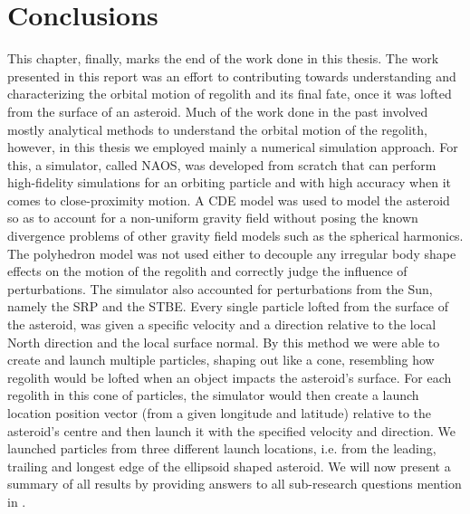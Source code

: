 \chapter{Conclusions}
\label{chap:conclusions}
\graphicspath{{Conclusions/}}

This chapter, finally, marks the end of the work done in this thesis. The work presented in this report was an effort to contributing towards understanding and characterizing the orbital motion of regolith and its final fate, once it was lofted from the surface of an asteroid. Much of the work done in the past involved mostly analytical methods to understand the orbital motion of the regolith, however, in this thesis we employed mainly a numerical simulation approach. For this, a simulator, called \gls{NAOS}, was developed from scratch that can perform high-fidelity simulations for an orbiting particle and with high accuracy when it comes to close-proximity motion.
%
\newline\newline
%
A \gls{CDE} model was used to model the asteroid so as to account for a non-uniform gravity field without posing the known divergence problems of other gravity field models such as the spherical harmonics. The polyhedron model was not used either to decouple any irregular body shape effects on the motion of the regolith and correctly judge the influence of perturbations. The simulator also accounted for perturbations from the Sun, namely the \gls{SRP} and the \gls{STBE}. Every single particle lofted from the surface of the asteroid, was given a specific velocity and a direction relative to the local North direction and the local surface normal. By this method we were able to create and launch multiple particles, shaping out like a cone, resembling how regolith would be lofted when an object impacts the asteroid's surface. For each regolith in this cone of particles, the simulator would then create a launch location position vector (from a given longitude and latitude) relative to the asteroid's centre and then launch it with the specified velocity and direction. We launched particles from three different launch locations, i.e. from the leading, trailing and longest edge of the ellipsoid shaped asteroid.
%
\newline\newline
%
We will now present a summary of all results by providing answers to all sub-research questions mention in .
